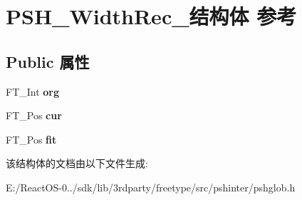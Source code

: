 \hypertarget{struct_p_s_h___width_rec__}{}\section{P\+S\+H\+\_\+\+Width\+Rec\+\_\+结构体 参考}
\label{struct_p_s_h___width_rec__}
\subsection*{Public 属性}
\begin{DoxyCompactItemize}
\item 
\mbox{\label{struct_p_s_h___width_rec___a022acc48f09b5c56516af83158a8dcbb}} 
F\+T\+\_\+\+Int {\bfseries org}
\item 
\mbox{\label{struct_p_s_h___width_rec___a2478a2f260d16c420f2d885b0ef91cb3}} 
F\+T\+\_\+\+Pos {\bfseries cur}
\item 
\mbox{\label{struct_p_s_h___width_rec___ad6263a5fd5199c57e7bebf51faa08142}} 
F\+T\+\_\+\+Pos {\bfseries fit}
\end{DoxyCompactItemize}


该结构体的文档由以下文件生成\+:\begin{DoxyCompactItemize}
\item 
E\+:/\+React\+O\+S-\/0../sdk/lib/3rdparty/freetype/src/pshinter/pshglob.\+h\end{DoxyCompactItemize}
